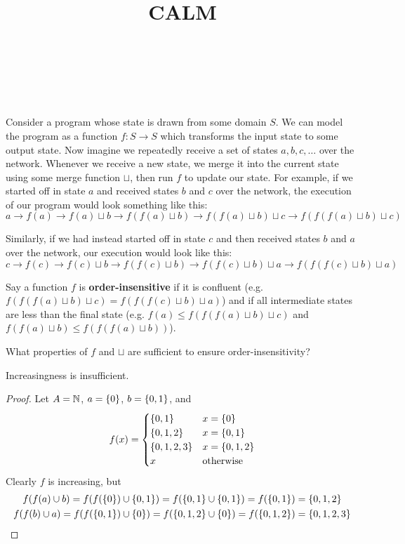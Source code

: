 \documentclass{mwhittaker}
\title{CALM}
\author{\ }
\date{\ }
\newcommand{\join}{\sqcup}
\begin{document}
\maketitle

Consider a program whose state is drawn from some domain $S$. We can model the
program as a function $f: S \to S$ which transforms the input state to some
output state. Now imagine we repeatedly receive a set of states $a, b, c,
\ldots$ over the network. Whenever we receive a new state, we merge it into the
current state using some merge function $\join$, then run $f$ to update our
state. For example, if we started off in state $a$ and received states $b$ and
$c$ over the network, the execution of our program would look something like
this:
\[
  a \to f(a)
    \to f(a) \join b
    \to f(f(a) \join b)
    \to f(f(a) \join b) \join c
    \to f(f(f(a) \join b) \join c)
\]

Similarly, if we had instead started off in state $c$ and then received states
$b$ and $a$ over the network, our execution would look like this:
\[
  c \to f(c)
    \to f(c) \join b
    \to f(f(c) \join b)
    \to f(f(c) \join b) \join a
    \to f(f(f(c) \join b) \join a)
\]

Say a function $f$ is \textbf{order-insensitive} if it is confluent (e.g.
$f(f(f(a) \join b) \join c) = f(f(f(c) \join b) \join a)$) and if all
intermediate states are less than the final state (e.g.  $f(a) \leq f(f(f(a)
\join b) \join c)$ and $f(f(a) \join b) \leq f(f(f(a) \join b))$).

What properties of $f$ and $\join$ are sufficient to ensure
order-insensitivity?

\begin{claim}
  Increasingness is insufficient.
\end{claim}
\begin{proof}
  Let $A = \mathbb{N}$, $a = \{0\}$, $b = \{0, 1\}$, and \[
    f(x) = \begin{cases}
      \{0, 1\} & x = \{0\} \\
      \{0, 1, 2\} & x = \{0, 1\} \\
      \{0, 1, 2, 3\} & x = \{0, 1, 2\} \\
      x & \text{otherwise} \\
    \end{cases}
  \]
  Clearly $f$ is increasing, but
  \begin{gather*}
    f(f(a) \cup b)
      = f(f(\{0\}) \cup \{0, 1\})
      = f(\{0, 1\} \cup \{0, 1\})
      = f(\{0, 1\})
      = \{0, 1, 2\} \\
    f(f(b) \cup a)
      = f(f(\{0, 1\}) \cup \{0\})
      = f(\{0, 1, 2\} \cup \{0\})
      = f(\{0, 1, 2\})
      = \{0, 1, 2, 3\}
  \end{gather*}
\end{proof}
\end{document}

